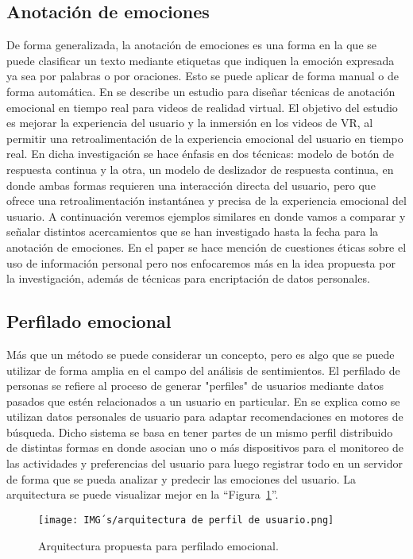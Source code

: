 \documentclass[12pt, conference]{IEEEtran}
\begin{document}
\subsection{Anotación de emociones}
De forma generalizada, la anotación de emociones es una forma en la que se puede clasificar un texto mediante etiquetas que indiquen la emoción expresada ya sea por palabras o por oraciones. Esto se puede aplicar de forma manual o de forma automática. En \cite{f3} se describe un estudio para diseñar técnicas de anotación emocional en tiempo real para videos de realidad virtual. El objetivo del estudio es mejorar la experiencia del usuario y la inmersión en los videos de VR, al permitir una retroalimentación de la experiencia emocional del usuario en tiempo real. En dicha investigación se hace énfasis en dos técnicas: modelo de botón de respuesta continua y la otra, un modelo de deslizador de respuesta continua, en donde ambas formas requieren una interacción directa del usuario, pero que ofrece una retroalimentación instantánea y precisa de la experiencia emocional del usuario. A continuación veremos ejemplos similares en donde vamos a comparar y señalar distintos acercamientos que se han investigado hasta la fecha para la anotación de emociones. En el paper se hace mención de cuestiones éticas sobre el uso de información personal pero nos enfocaremos más en la idea propuesta por la investigación, además de técnicas para encriptación de datos personales.

\subsection{Perfilado emocional}
Más que un método se puede considerar un concepto, pero es algo que se puede utilizar de forma amplia en el campo del análisis de sentimientos. El perfilado de personas se refiere al proceso de generar "perfiles" de usuarios mediante datos pasados que estén relacionados a un usuario en particular. En \cite{f12} se explica como se utilizan datos personales de usuario para adaptar recomendaciones en motores de búsqueda. Dicho sistema se basa en tener partes de un mismo perfil distribuido de distintas formas en donde asocian uno o más dispositivos para el monitoreo de las actividades y preferencias del usuario para luego registrar todo en un servidor de forma que se pueda analizar y predecir las emociones del usuario. La arquitectura se puede visualizar mejor en la ``Figura~\ref{fig10}''.
\begin{figure}[htbp]
  \caption{Arquitectura propuesta para perfilado emocional.}
  \centerline{\texttt{[image: IMG´s/arquitectura de perfil de usuario.png]}}
  \label{fig10}
\end{figure}
\end{document}
